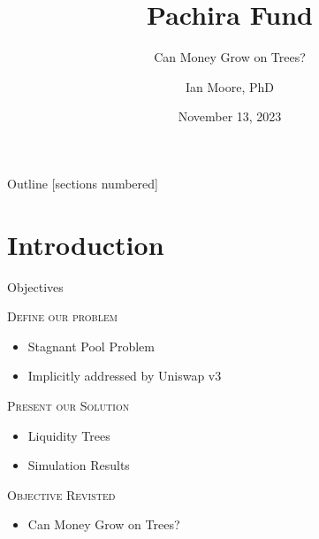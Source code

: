 \documentclass[10pt,xcolor=svgnames]{beamer} %
\title{Pachira Fund}
\author[Name]{Ian Moore, PhD \inst{$\dagger$}}%
\subtitle{Can Money Grow on Trees?}
\institute[shortinst]{\inst{$\dagger$} Tokenomics Researcher / Engineer @ Syslabs (email: imoore@syscoin.org) }
\date{November 13, 2023} %
\begin{document}
{
\maketitle
}%


\begin{frame}{Outline}
  [sections numbered] %
  \tableofcontents[hideallsubsections] %
\end{frame}

\section{Introduction}



\begin{frame}{Objectives}

\begin{exampleblock}{\textsc{Define our problem}}
\begin{itemize}
  \item Stagnant Pool Problem
  \item Implicitly addressed by Uniswap v3
\end{itemize}  
\end{exampleblock}

\begin{exampleblock}{\textsc{Present our Solution}}
\begin{itemize}
  \item Liquidity Trees
  \item Simulation Results
\end{itemize}
\end{exampleblock}

\begin{exampleblock}{\textsc{Objective Revisted}}
\begin{itemize}
  \item Can Money Grow on Trees?
\end{itemize}
\end{exampleblock}

\end{frame}
\end{document}
